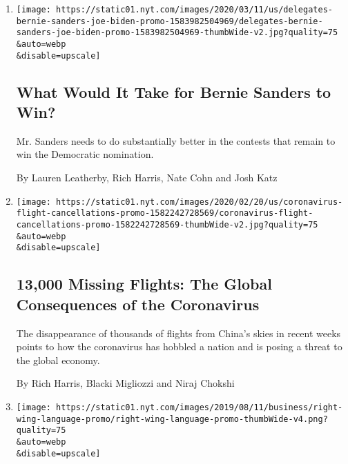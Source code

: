 \begin{enumerate}
\def\labelenumi{\arabic{enumi}.}
\item
  \href{/interactive/2020/03/12/us/elections/delegates-bernie-sanders-joe-biden.html}{}

  \texttt{[image: https://static01.nyt.com/images/2020/03/11/us/delegates-bernie-sanders-joe-biden-promo-1583982504969/delegates-bernie-sanders-joe-biden-promo-1583982504969-thumbWide-v2.jpg?quality=75\\\&auto=webp\\\&disable=upscale]}

  \hypertarget{what-would-it-take-for-bernie-sanders-to-win}{%
  \subsection{What Would It Take for Bernie Sanders to
  Win?}\label{what-would-it-take-for-bernie-sanders-to-win}}

  Mr. Sanders needs to do substantially better in the contests that
  remain to win the Democratic nomination.

  By Lauren Leatherby, Rich Harris, Nate Cohn and Josh Katz
\item
  \href{/interactive/2020/02/21/business/coronavirus-airline-travel.html}{}

  \texttt{[image: https://static01.nyt.com/images/2020/02/20/us/coronavirus-flight-cancellations-promo-1582242728569/coronavirus-flight-cancellations-promo-1582242728569-thumbWide-v2.jpg?quality=75\\\&auto=webp\\\&disable=upscale]}

  \hypertarget{13000-missing-flights-the-global-consequences-of-the-coronavirus}{%
  \subsection{13,000 Missing Flights: The Global Consequences of the
  Coronavirus}\label{13000-missing-flights-the-global-consequences-of-the-coronavirus}}

  The disappearance of thousands of flights from China's skies in recent
  weeks points to how the coronavirus has hobbled a nation and is posing
  a threat to the global economy.

  By Rich Harris, Blacki Migliozzi and Niraj Chokshi
\item
  \href{/interactive/2019/08/11/business/media/el-paso-killer-conservative-media.html}{}

  \texttt{[image: https://static01.nyt.com/images/2019/08/11/business/right-wing-language-promo/right-wing-language-promo-thumbWide-v4.png?quality=75\\\&auto=webp\\\&disable=upscale]}


\end{enumerate}
